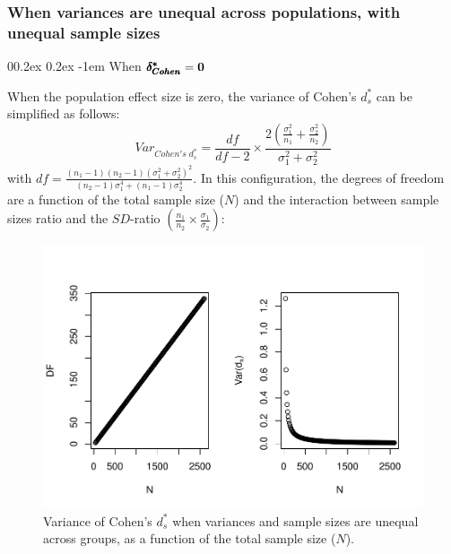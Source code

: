 \documentclass[
  english,
  man]{apa6}
\makeatletter
\let\oldparagraph\paragraph
\renewcommand{\paragraph}[1]{\oldparagraph{#1}\mbox{}}
\renewcommand{\paragraph}{\@startsection{paragraph}{4}{\parindent}%
  {0\baselineskip \@plus 0.2ex \@minus 0.2ex}%
  {-1em}%
  {\normalfont\normalsize\bfseries\itshape\typesectitle}}
\makeatother
\begin{document}
\hypertarget{when-variances-are-unequal-across-populations-with-unequal-sample-sizes-1}{%
\subsubsection{When variances are unequal across populations, with unequal sample sizes}\label{when-variances-are-unequal-across-populations-with-unequal-sample-sizes-1}}

\hypertarget{when-bf-pmbdelta_cohen0-3}{%
\paragraph{\texorpdfstring{When \(\bf \pmb{\delta^*_{Cohen}}=0\)}{When \textbackslash bf \textbackslash pmb\{\textbackslash delta\^{}*\_\{Cohen\}\}=0}}\label{when-bf-pmbdelta_cohen0-3}}

When the population effect size is zero, the variance of Cohen's \(d^*_s\) can be simplified as follows:
\[Var_{Cohen's \; d^*_s} = \frac{df}{df-2} \times \frac{2\left( \frac{\sigma^2_1}{n_1} + \frac{\sigma^2_2}{n_2} \right)}{\sigma^2_1+\sigma^2_2}\]
with \(df =\frac{(n_1-1)(n_2-1)(\sigma^2_1+\sigma^2_2)^2}{(n_2-1)\sigma_1^4+(n_1-1)\sigma_2^4}\). In this configuration, the degrees of freedom are a function of the total sample size (\(N\)) and the interaction between sample sizes ratio and the \(SD\)-ratio \(\left(\frac{n_1}{n_2}\times\frac{\sigma_1}{\sigma_2} \right)\):

\begin{figure}
\centering
\includegraphics{Theoretical-Variance-of-all-estimators-as-a-function-of-population-parameters_files/figure-latex/varcohendprimehetunbalNsize2-1.pdf}
\caption{\label{fig:varcohendprimehetunbalNsize2}Variance of Cohen's \(d^*_s\) when variances and sample sizes are unequal across groups, as a function of the total sample size (\(N\)).}
\end{figure}
\end{document}
